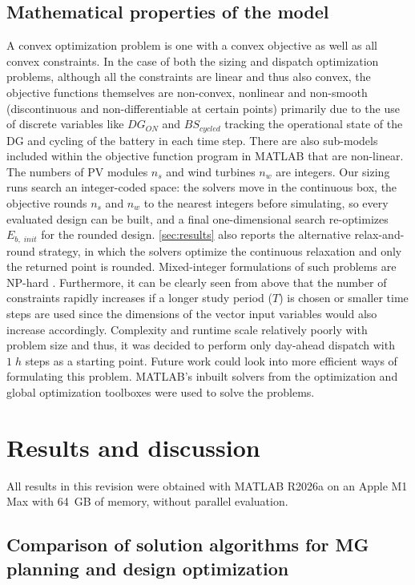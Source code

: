 \documentclass[final,3p,times]{elsarticle}
\begin{document}
\subsection{Mathematical properties of the model}

A convex optimization problem is one with a convex objective as well as all convex constraints. In the case of both the sizing and dispatch optimization problems, although all the constraints are linear and thus also convex, the objective functions themselves are non-convex, nonlinear and non-smooth (discontinuous and non-differentiable at certain points) primarily due to the use of discrete variables like $DG_{ON}$ and $BS_{cycled}$ tracking the operational state of the DG and cycling of the battery in each time step. There are also sub-models included within the objective function program in MATLAB that are non-linear. The numbers of PV modules $n_s$ and wind turbines $n_w$ are integers. Our sizing runs search an integer-coded space: the solvers move in the continuous box, the objective rounds $n_s$ and $n_w$ to the nearest integers before simulating, so every evaluated design can be built, and a final one-dimensional search re-optimizes $E_{b,\;init}$ for the rounded design. \cref{sec:results} also reports the alternative relax-and-round strategy, in which the solvers optimize the continuous relaxation and only the returned point is rounded. Mixed-integer formulations of such problems are NP-hard \cite{parisio2013}. Furthermore, it can be clearly seen from above that the number of constraints rapidly increases if a longer study period ($T$) is chosen or smaller time steps are used since the dimensions of the vector input variables would also increase accordingly. Complexity and runtime scale relatively poorly with problem size and thus, it was decided to perform only day-ahead dispatch with $1 \; h$ steps as a starting point. Future work could look into more efficient ways of formulating this problem. MATLAB's inbuilt solvers from the optimization and global optimization toolboxes were used to solve the problems.

\section{Results and discussion \label{sec:results}}

All results in this revision were obtained with MATLAB R2026a on an Apple M1 Max with 64~GB of memory, without parallel evaluation.

\subsection{Comparison of solution algorithms for MG planning and design optimization}
\end{document}
